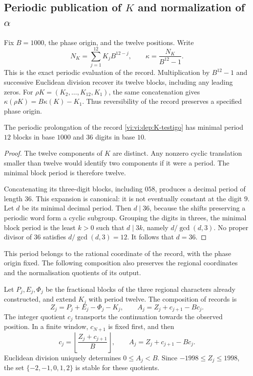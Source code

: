 \subsection{\texorpdfstring{Periodic publication of \(K\) and normalization of \(\alpha\)}{Periodic publication of K and normalization of alpha}}
\label{vi:vi:dep:alpha}

Fix \(B=1000\), the phase origin, and the twelve positions. Write
\[
 N_K=\sum_{j=1}^{12}K_jB^{12-j},\qquad
 \kappa=\frac{N_K}{B^{12}-1}.
\]
This is the exact periodic evaluation of the record. Multiplication
by \(B^{12}-1\) and successive Euclidean division recover its twelve
blocks, including any leading zeros. For
\(\rho K=(K_2,\ldots,K_{12},K_1)\), the same concatenation gives
\(\kappa(\rho K)=B\kappa(K)-K_1\). Thus reversibility
of the record preserves a specified phase origin.

\begin{proposition}
\label{vi:vi:dep:periodo-minimo-k}
The periodic prolongation of the record \eqref{vi:vi:dep:K-testigo}
has minimal period \(12\) blocks in base \(1000\) and
\(36\) digits in base \(10\).
\end{proposition}
\begin{proof}
The twelve components of \(K\) are distinct. Any nonzero cyclic
translation smaller than twelve would identify two components if it were
a period. The minimal block period is therefore twelve.

Concatenating its three-digit blocks, including \(058\),
produces a decimal period of length \(36\). This expansion is
canonical: it is not eventually constant at the digit \(9\).
Let \(d\) be its minimal decimal period. Then \(d\mid36\),
because the shifts preserving a periodic word form
a cyclic subgroup. Grouping the digits in threes, the minimal
block period is the least \(k>0\) such that \(d\mid3k\), namely
\(d/\gcd(d,3)\). No proper divisor of \(36\)
satisfies \(d/\gcd(d,3)=12\). It follows that \(d=36\).
\end{proof}

This period belongs to the rational coordinate of the record, with the
phase origin fixed. The following composition also preserves the
regional coordinates and the normalisation quotients of its output.

Let \(P_j,E_j,\Phi_j\) be the fractional blocks of the three
regional characters already constructed, and extend \(K_j\) with period
twelve. The composition of records is
\begin{equation}
 Z_j=P_j+E_j-\Phi_j-K_j,
 \qquad
 A_j=Z_j+c_{j+1}-Bc_j.
 \label{vi:vi:dep:normalizacion-alpha}
\end{equation}
The integer quotient \(c_j\) transports the continuation towards the observed
position. In a finite window, \(c_{N+1}\) is fixed first, and then
\[
 c_j=\left\lfloor\frac{Z_j+c_{j+1}}B\right\rfloor,
 \qquad A_j=Z_j+c_{j+1}-Bc_j.
\]
Euclidean division uniquely determines \(0\le A_j<B\).
Since \(-1998\le Z_j\le1998\), the set
\(\{-2,-1,0,1,2\}\) is stable for these quotients.

